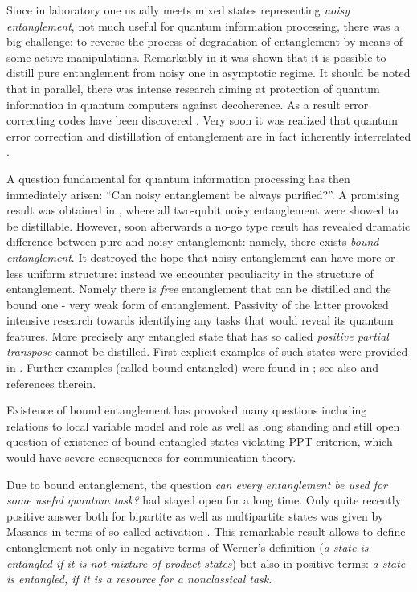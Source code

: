 \documentclass[twocolumn,aps,rmp]{revtex4}
\begin{document}
Since in laboratory one usually meets mixed states representing {\it
  noisy entanglement}, not much useful for quantum information
processing, there was a big challenge: to reverse the process of
degradation of entanglement by means of some active manipulations.
Remarkably in \cite{BBPSSW1996} it was shown that it is possible to
distill pure entanglement from noisy one in asymptotic regime. It
should be noted that in parallel, there was intense research aiming at
protection of quantum information in quantum computers against
decoherence. As a result error correcting codes have been discovered
\cite{Shor,Steane-codes-prl}. Very soon it was realized that quantum
error correction and distillation of entanglement are in fact
inherently interrelated \cite{BDSW1996}.

A question fundamental for quantum information processing has then
immediately arisen: ``Can noisy entanglement be always purified?''. A
promising result was obtained in \cite{HHH1997-distill}, where all
two-qubit noisy entanglement were showed to be distillable. However,
soon afterwards a no-go type result \cite{bound} has revealed dramatic
difference between pure and noisy entanglement: namely, there exists
{\it bound entanglement}. It destroyed the hope that noisy
entanglement can have more or less uniform structure: instead we
encounter peculiarity in the structure of entanglement. Namely there
is {\it free} entanglement that can be distilled and the bound one -
very weak form of entanglement. Passivity of the latter provoked
intensive research towards identifying any tasks that would reveal its
quantum features. More precisely any entangled state that has so
called {\it positive partial transpose} cannot be distilled. First
explicit examples of such states were provided in
\cite{Pawel97}. Further examples (called bound entangled) were found
in \cite{BrussPeres2000, BennettUPBI1999,WernerWolf}; see also
\cite{DagBook,ClarissePhd} and references therein.


Existence of bound entanglement has provoked many questions including
relations to local variable model and role as well as long standing
and still open question of existence of bound entangled states
violating PPT criterion, which would have severe consequences for
communication theory.

Due to bound entanglement, the question {\it can every entanglement be
used for some useful quantum task?} had stayed open for a long
time. Only quite recently positive answer both for bipartite as well
as multipartite states was given by Masanes
\cite{Masanes1_activation,Masanes-multiactiv} in terms of so-called
activation \cite{activation}. This remarkable result allows to define
entanglement not only in negative terms of Werner's definition ({\it a
  state is entangled if it is not mixture of product states}) but also
in positive terms: {\it a state is entangled, if it is a resource for
  a nonclassical task}.
\end{document}
